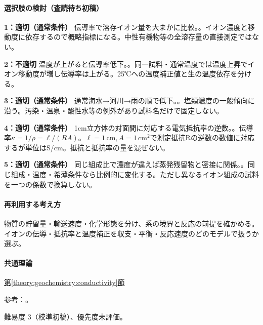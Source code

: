 \paragraph{選択肢の検討（査読待ち初稿）}\mbox{}\par

\noindent\textbf{1：適切（通常条件）} 伝導率で溶存イオン量を大まかに比較。。イオン濃度と移動度に依存するので概略指標になる。中性有機物等の全溶存量の直接測定ではない。\par

\noindent\textbf{2：不適切} 温度が上がると伝導率低下。。同一試料・通常温度では温度上昇でイオン移動度が増し伝導率は上がる。25℃への温度補正値と生の温度依存を分ける。\par

\noindent\textbf{3：適切（通常条件）} 通常海水→河川→雨の順で低下。。塩類濃度の一般傾向に沿う。汚染・温泉・酸性水等の例外があり試料名だけで固定しない。\par

\noindent\textbf{4：適切（通常条件）} 1cm立方体の対面間に対応する電気抵抗率の逆数。。伝導率\(\kappa=1/\rho=\ell/(RA)\)。\(\ell=1\,\mathrm{cm},A=1\,\mathrm{cm}^2\)で測定抵抗Rの逆数の数値に対応するが単位はS/cm。抵抗と抵抗率の量を混ぜない。\par

\noindent\textbf{5：適切（通常条件）} 同じ組成比で濃度が違えば蒸発残留物と密接に関係。。同じ組成・温度・希薄条件なら比例的に変化する。ただし異なるイオン組成の試料を一つの係数で換算しない。\par

\paragraph{再利用する考え方} 物質の貯留量・輸送速度・化学形態を分け、系の境界と反応の前提を確かめる。イオンの伝導・抵抗率と温度補正を収支・平衡・反応速度のどのモデルで扱うか選ぶ。

\paragraph{共通理論} \hyperref[theory:geochemistry:conductivity]{第\ref*{theory:geochemistry:conductivity}節}

\par 参考：\cite{gc_hem,gc_conductance,gc_conductance1994}。

\par 難易度 3（校準初稿）、優先度未評価。

